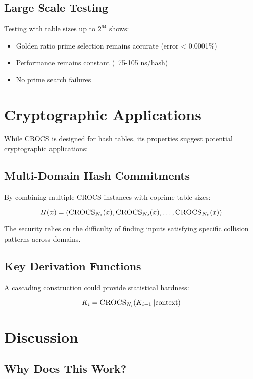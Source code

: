 \documentclass[11pt,a4paper]{article}
\theoremstyle{definition}
\newcommand{\crocs}{\textsc{CROCS}}
\begin{document}
\subsection{Large Scale Testing}

Testing with table sizes up to $2^{64}$ shows:
\begin{itemize}
\item Golden ratio prime selection remains accurate (error < 0.0001\%)
\item Performance remains constant (~75-105 ns/hash)
\item No prime search failures
\end{itemize}

\section{Cryptographic Applications}

While \crocs{} is designed for hash tables, its properties suggest potential cryptographic applications:

\subsection{Multi-Domain Hash Commitments}

By combining multiple \crocs{} instances with coprime table sizes:

$$H(x) = \left(\crocs_{N_1}(x), \crocs_{N_2}(x), \ldots, \crocs_{N_k}(x)\right)$$

The security relies on the difficulty of finding inputs satisfying specific collision patterns across domains.

\subsection{Key Derivation Functions}

A cascading construction could provide statistical hardness:

$$K_i = \crocs_{N_i}(K_{i-1} \| \text{context})$$

\section{Discussion}

\subsection{Why Does This Work?}
\end{document}
